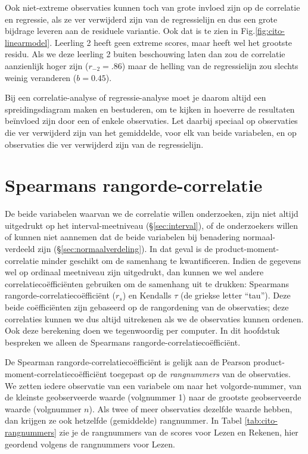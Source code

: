 \documentclass[
]{book}
\begin{document}
Ook niet-extreme observaties kunnen toch van grote invloed zijn op de
correlatie en regressie, als ze ver verwijderd zijn van de regressielijn
en dus een grote bijdrage leveren aan de residuele variantie. Ook dat is
te zien in Fig.\ref{fig:cito-linearmodel}.
Leerling 2 heeft geen extreme scores,
maar heeft wel het grootste residu. Als we deze leerling 2 buiten
beschouwing laten dan zou de correlatie aanzienlijk hoger zijn
(\(r_{-2}=.86\)) maar de helling van de regressielijn zou slechts weinig
veranderen (\(b=0.45\)).

Bij een correlatie-analyse of regressie-analyse moet je daarom altijd
een spreidingsdiagram maken en bestuderen, om te kijken in hoeverre de
resultaten beïnvloed zijn door een of enkele observaties. Let daarbij
speciaal op observaties die ver verwijderd zijn van het gemiddelde, voor
elk van beide variabelen, en op observaties die ver verwijderd zijn van
de regressielijn.

\hypertarget{sec:Spearman}{%
\section{Spearmans rangorde-correlatie}\label{sec:Spearman}}

De beide variabelen waarvan we de correlatie willen onderzoeken, zijn
niet altijd uitgedrukt op het interval-meetniveau
(§\ref{sec:interval}), of de onderzoekers willen of kunnen niet aannemen dat
de beide variabelen bij benadering normaal-verdeeld zijn
(§\ref{sec:normaalverdeling}).
In dat geval is de
product-moment-correlatie minder geschikt om de samenhang te
kwantificeren. Indien de gegevens wel op ordinaal meetniveau zijn
uitgedrukt, dan kunnen we wel andere correlatiecoëfficiënten gebruiken
om de samenhang uit te drukken: Spearmans rangorde-correlatiecoëfficiënt
(\(r_s\)) en Kendalls \(\tau\) (de griekse letter ``tau''). Deze beide
coëfficiënten zijn gebaseerd op de rangordening van de observaties; deze
correlaties kunnen we dus altijd uitrekenen als we de observaties kunnen
ordenen. Ook deze berekening doen we tegenwoordig per computer. In dit
hoofdstuk bespreken we alleen de Spearmans
rangorde-correlatiecoëfficiënt.

De Spearman rangorde-correlatiecoëfficiënt is gelijk aan de Pearson
product-moment-correlatiecoëfficiënt toegepast op de \emph{rangnummers} van de
observaties. We zetten iedere observatie van een variabele om naar het
volgorde-nummer, van de kleinste geobserveerde waarde (volgnummer 1)
naar de grootste geobserveerde waarde (volgnummer \(n\)). Als twee of meer
observaties dezelfde waarde hebben, dan krijgen ze ook hetzelfde
(gemiddelde) rangnummer. In
Tabel \ref{tab:cito-rangnummers} zie je de rangnummers van de scores
voor Lezen en Rekenen, hier geordend volgens de rangnummers voor Lezen.
\end{document}
